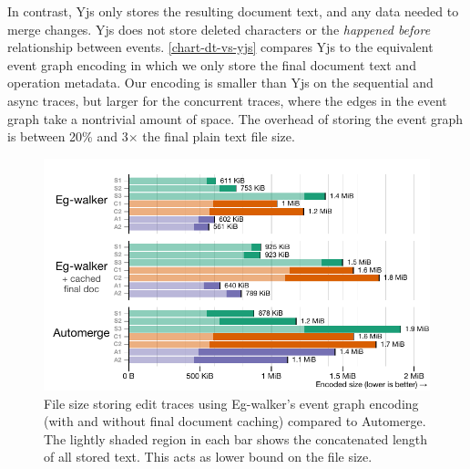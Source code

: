 \documentclass[sigplan,10pt]{acmart}
\newcommand{\algname}{Eg-walker\xspace}
\begin{document}

In contrast, Yjs only stores the resulting document text, and any data needed to merge changes.
Yjs does not store deleted characters or the \emph{happened before} relationship between events.
\autoref{chart-dt-vs-yjs} compares Yjs to the equivalent event graph encoding in which we only store the final document text and operation metadata.
Our encoding is smaller than Yjs on the sequential and async traces, but larger for the concurrent traces, where the edges in the event graph take a nontrivial amount of space.
The overhead of storing the event graph is between 20\% and 3$\times$ the final plain text file size.

\begin{figure}
  \includegraphics[width=\linewidth]{diagrams/filesize_full.pdf}
  \caption{File size storing edit traces using \algname's event graph encoding (with and without final document caching) compared to Automerge. The lightly shaded region in each bar shows the concatenated length of all stored text. This acts as lower bound on the file size.}
  \label{chart-dt-vs-automerge}
\end{figure}
\end{document}

